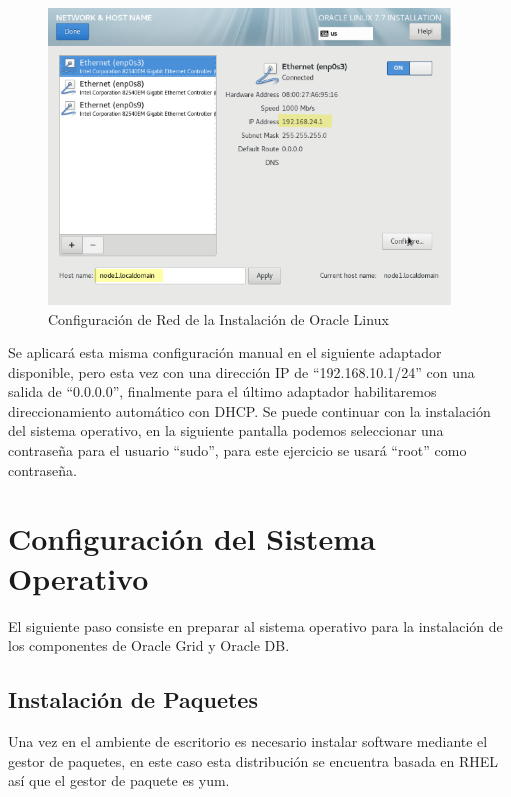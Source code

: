 \documentclass{article}
\begin{document}
\begin{figure}[H]
	\begin{center}
		\includegraphics[width=0.95\textwidth]{vm_networking.png}
	\end{center}
	\caption{Configuración de Red de la Instalación de Oracle Linux}
\end{figure}

Se aplicará esta misma configuración manual en el siguiente adaptador disponible, pero esta vez con una dirección IP de ``192.168.10.1/24'' con una salida de ``0.0.0.0'', finalmente para el último adaptador habilitaremos direccionamiento automático con DHCP. Se puede continuar con la instalación del sistema operativo, en la siguiente pantalla podemos seleccionar una contraseña para el usuario ``sudo'', para este ejercicio se usará ``root'' como contraseña.

\section{Configuración del Sistema Operativo}

El siguiente paso consiste en preparar al sistema operativo para la instalación de los componentes de Oracle Grid y Oracle DB.

\subsection{Instalación de Paquetes}

Una vez en el ambiente de escritorio es necesario instalar software mediante el gestor de paquetes, en este caso esta distribución se encuentra basada en RHEL así que el gestor de paquete es yum.
\end{document}
